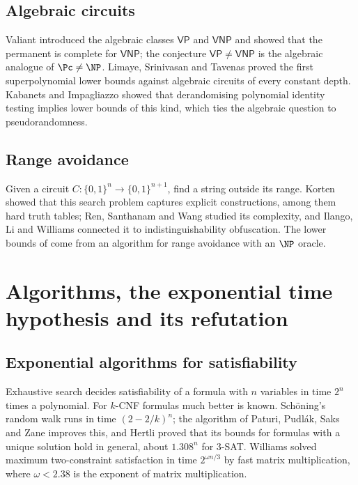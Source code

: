 \subsection{Algebraic circuits}
Valiant \cite{Val79a} introduced the algebraic classes $\mathsf{VP}$ and
$\mathsf{VNP}$ and showed that the permanent is complete for $\mathsf{VNP}$; the
conjecture $\mathsf{VP}\ne\mathsf{VNP}$ is the algebraic analogue of $\Pc\ne\NP$.
Limaye, Srinivasan and Tavenas \cite{LST21} proved the first superpolynomial
lower bounds against algebraic circuits of every constant depth. Kabanets and
Impagliazzo \cite{KI04} showed that derandomising polynomial identity testing
implies lower bounds of this kind, which ties the algebraic question to
pseudorandomness.

\subsection{Range avoidance}
Given a circuit $C:\{0,1\}^n\to\{0,1\}^{n+1}$, find a string outside its range.
Korten \cite{Kor21} showed that this search problem captures explicit
constructions, among them hard truth tables; Ren, Santhanam and Wang
\cite{RSW22} studied its complexity, and Ilango, Li and Williams \cite{ILW23}
connected it to indistinguishability obfuscation. The lower bounds of
\cite{CHR24,Li24} come from an algorithm for range avoidance with an $\NP$
oracle.

\section{Algorithms, the exponential time hypothesis and its refutation}\label{sec:algorithms}

\subsection{Exponential algorithms for satisfiability}
Exhaustive search decides satisfiability of a formula with $n$ variables in
time $2^n$ times a polynomial. For $k$-CNF formulas much better is known.
Sch\"oning's random walk \cite{Sch99} runs in time $(2-2/k)^n$; the algorithm of
Paturi, Pudl\'ak, Saks and Zane \cite{PPSZ05} improves this, and Hertli
\cite{Her14} proved that its bounds for formulas with a unique solution hold in
general, about $1.308^n$ for $3$-SAT. Williams \cite{Wil05} solved maximum
two-constraint satisfaction in time $2^{\omega n/3}$ by fast matrix
multiplication, where $\omega<2.38$ is the exponent of matrix multiplication.

